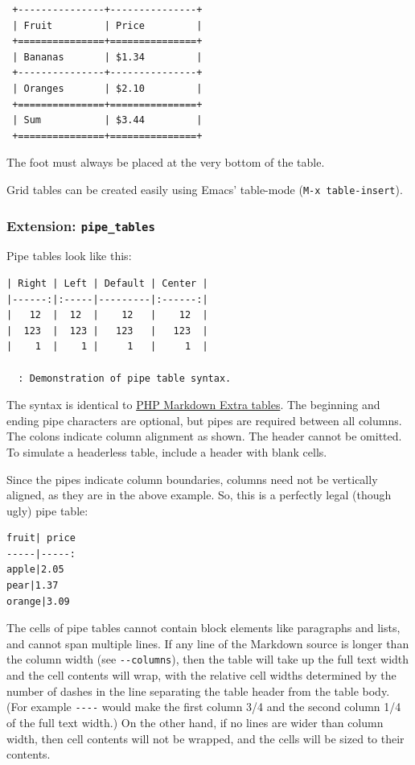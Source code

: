 \documentclass[
]{article}
\begin{document}
\begin{verbatim}
 +---------------+---------------+
 | Fruit         | Price         |
 +===============+===============+
 | Bananas       | $1.34         |
 +---------------+---------------+
 | Oranges       | $2.10         |
 +===============+===============+
 | Sum           | $3.44         |
 +===============+===============+
\end{verbatim}

The foot must always be placed at the very bottom of the table.

Grid tables can be created easily using Emacs' table-mode
(\texttt{M-x\ table-insert}).

\hypertarget{extension-pipe_tables}{%
\subsubsection{\texorpdfstring{Extension:
\texttt{pipe\_tables}}{Extension: pipe\_tables}}\label{extension-pipe_tables}}

Pipe tables look like this:

\begin{verbatim}
| Right | Left | Default | Center |
|------:|:-----|---------|:------:|
|   12  |  12  |    12   |    12  |
|  123  |  123 |   123   |   123  |
|    1  |    1 |     1   |     1  |

  : Demonstration of pipe table syntax.
\end{verbatim}

The syntax is identical to
\href{https://michelf.ca/projects/php-markdown/extra/\#table}{PHP
Markdown Extra tables}. The beginning and ending pipe characters are
optional, but pipes are required between all columns. The colons
indicate column alignment as shown. The header cannot be omitted. To
simulate a headerless table, include a header with blank cells.

Since the pipes indicate column boundaries, columns need not be
vertically aligned, as they are in the above example. So, this is a
perfectly legal (though ugly) pipe table:

\begin{verbatim}
fruit| price
-----|-----:
apple|2.05
pear|1.37
orange|3.09
\end{verbatim}

The cells of pipe tables cannot contain block elements like paragraphs
and lists, and cannot span multiple lines. If any line of the Markdown
source is longer than the column width (see \texttt{-\/-columns}), then
the table will take up the full text width and the cell contents will
wrap, with the relative cell widths determined by the number of dashes
in the line separating the table header from the table body. (For
example \texttt{-\/-\/-\textbar{}-} would make the first column 3/4 and
the second column 1/4 of the full text width.) On the other hand, if no
lines are wider than column width, then cell contents will not be
wrapped, and the cells will be sized to their contents.
\end{document}
